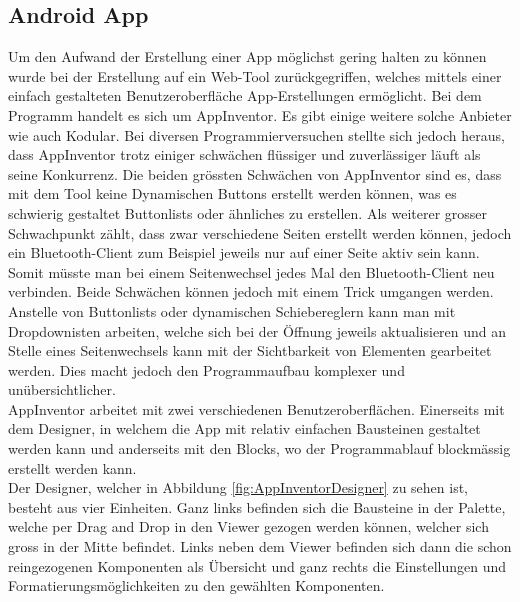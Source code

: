 \subsection{Android App}
\label{subsec:Software_App}

Um den Aufwand der Erstellung einer App möglichst gering halten zu können wurde bei der Erstellung auf ein Web-Tool zurückgegriffen, welches mittels einer einfach gestalteten Benutzeroberfläche App-Erstellungen ermöglicht. Bei dem Programm handelt es sich um AppInventor. Es gibt einige weitere solche Anbieter wie auch Kodular. Bei diversen Programmierversuchen stellte sich jedoch heraus, dass AppInventor trotz einiger schwächen flüssiger und zuverlässiger läuft als seine Konkurrenz.  Die beiden grössten Schwächen von AppInventor sind es, dass mit dem Tool keine Dynamischen Buttons erstellt werden können, was es schwierig gestaltet Buttonlists oder ähnliches zu erstellen. Als weiterer grosser Schwachpunkt zählt, dass zwar verschiedene Seiten erstellt werden können, jedoch ein Bluetooth-Client zum Beispiel jeweils nur auf einer Seite aktiv sein kann. Somit müsste man bei einem Seitenwechsel jedes Mal den Bluetooth-Client neu verbinden. Beide Schwächen können jedoch mit einem Trick umgangen werden. Anstelle von Buttonlists oder dynamischen Schiebereglern kann man mit Dropdownisten arbeiten, welche sich bei der Öffnung jeweils aktualisieren und an Stelle eines Seitenwechsels kann mit der Sichtbarkeit von Elementen gearbeitet werden. Dies macht jedoch den Programmaufbau komplexer und unübersichtlicher. \cite{appinventor_mit_nodate} \cite{kodular_kodular_nodate} \\


AppInventor arbeitet mit zwei verschiedenen Benutzeroberflächen. Einerseits mit dem Designer, in welchem die App mit relativ einfachen Bausteinen gestaltet werden kann und anderseits mit den Blocks, wo der Programmablauf blockmässig erstellt werden kann.\\

Der Designer, welcher in Abbildung \ref{fig:AppInventorDesigner} zu sehen ist, besteht aus vier Einheiten. Ganz links befinden sich die Bausteine in der Palette, welche per Drag and Drop in den Viewer gezogen werden können, welcher sich gross in der Mitte befindet. Links neben dem Viewer befinden sich dann die schon reingezogenen Komponenten als Übersicht und ganz rechts die Einstellungen und Formatierungsmöglichkeiten zu den gewählten Komponenten.

\newpage

